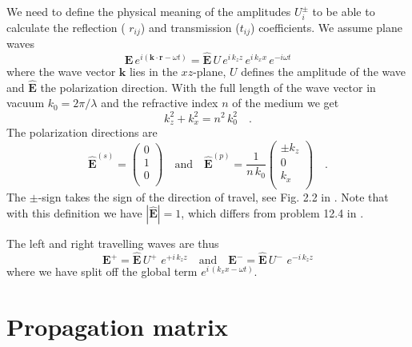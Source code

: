 We need to define the physical meaning of the amplitudes $U_i^\pm$ to be able to calculate the reflection ( $r_{ij}$) and transmission ($t_{ij}$) coefficients. We assume plane waves 
\begin{equation}
\mathbf{E} \, e^{i (\mathbf{k}  \cdot \mathbf{r} - \omega t)}
=
\mathbf{\hat{E}} \, U \, e^{i \, k_z z} \, e^{i \, k_x x} \, e^{-i \omega t}
\end{equation}
where the wave vector $\mathbf{k} $ lies in the $xz$-plane, $U$ defines the amplitude of the wave and $\mathbf{\hat{E}} $  the polarization direction.
With   the full length of the wave vector in vacuum $k_0 = 2 \pi / \lambda$ and the refractive index $n$ of the medium we get
\begin{equation}
k_{z}^2 + k_{x}^2  = n^2 \, k_0^2  \quad . 
\end{equation}
The polarization directions are
\begin{equation}
\mathbf{\hat{E}}^{(s)} = \begin{pmatrix}
 0 \\ 1 \\ 0 \\
\end{pmatrix}
\quad 
\text{and}
\quad
\mathbf{\hat{E}}^{(p)} =\frac{1}{n \, k_0} \begin{pmatrix}
\pm k_z \\ 0 \\  k_x  \\
\end{pmatrix} \quad . 
\end{equation}
The $\pm$-sign takes the sign of the direction of travel, see Fig. 2.2 in \cite{Novotny-Hecht2012}. Note that with this definition we have $|\mathbf{\hat{E}}| = 1$, which differs from problem 12.4 in \cite{Novotny-Hecht2012}.

The left and right travelling waves are thus
\begin{equation}
\mathbf{E}^+ = \mathbf{\hat{E}} \, U^+ \, \, e^{+ i \, k_z z}
\quad
\text{and}
\quad
\mathbf{E}^- = \mathbf{\hat{E}} \, U^- \, \, e^{- i \, k_z z}
\end{equation}
where we have split off the global term $ e^{i \, ( k_x x - \omega t)}$.

\section{Propagation matrix}

